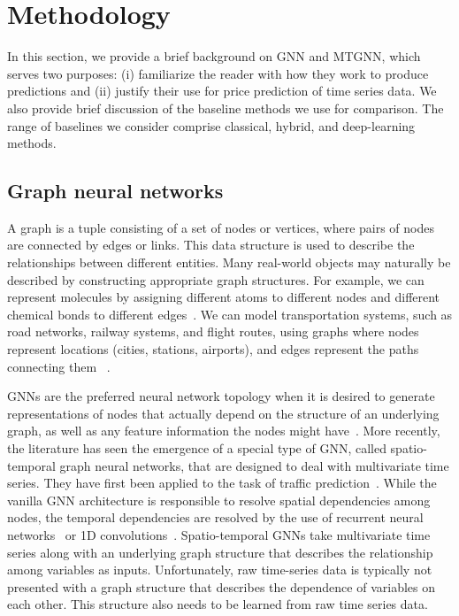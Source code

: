 \section{Methodology}
\label{sec:methodology}
%
In this section, we provide a brief background on GNN and MTGNN, which serves
two purposes: (i) familiarize the reader with how they work to produce
predictions and (ii) justify their use for price prediction of time series data.
We also provide brief discussion of the baseline methods we use for comparison.
The range of baselines we consider comprise classical, hybrid, and deep-learning
methods.

\subsection{Graph neural networks}
\label{ssec:gnn}

A graph is a tuple consisting of a set of nodes or vertices, where pairs of nodes are connected by 
edges or links. This data structure is used to describe the relationships between different
entities. Many real-world objects may naturally be described by constructing appropriate graph 
structures. For example, we can represent molecules by assigning different atoms to different nodes and different chemical bonds to different edges~\citep{prince2023understanding}. We can model transportation systems, such as road networks, railway systems, and flight routes, using graphs where nodes represent locations (cities, stations, airports), and edges represent the paths connecting them ~\citep{rahmani2023graph}.

GNNs are the preferred neural network topology when it is desired to generate representations of nodes
that actually depend on the structure of an underlying graph, as well as any feature information
the nodes might have~\citep{hamilton2020graph}. More recently, the literature has seen the emergence of a
special type of GNN, called spatio-temporal graph neural networks, that are designed to deal with
multivariate time series. They have first been applied to the task of traffic
prediction~\citep{chen2020multi,li2017diffusion,wu2019graph,yu2017spatio,zheng2020gman}. While the vanilla 
GNN architecture is responsible to resolve spatial dependencies among nodes, the temporal dependencies 
are resolved by the use of recurrent neural networks~\citep{li2017diffusion,seo2018structured} or 1D 
convolutions~\citep{yan2018spatial,yu2017spatio}. Spatio-temporal GNNs take multivariate time series along
with an underlying graph structure that describes the relationship among variables as inputs. Unfortunately, 
raw time-series data is typically not presented with a graph structure that describes the dependence of
variables on each other. This structure also needs to be learned from raw time series data.

